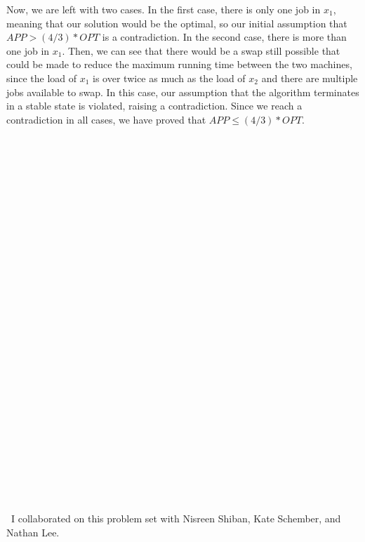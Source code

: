 \documentclass[11pt]{article}
\begin{document}
\begin{enumerate}
Now, we are left with two cases. In the first case, there is only one job in $x_1$, meaning that our solution would be the optimal, so our initial assumption that $APP > (4/3) * OPT$ is a contradiction. In the second case, there is more than one job in $x_1$. Then, we can see that there would be a swap still possible that could be made to reduce the maximum running time between the two machines, since the load of $x_1$ is over twice as much as the load of $x_2$ and there are multiple jobs available to swap. In this case, our assumption that the algorithm terminates in a stable state is violated, raising a contradiction. Since we reach a contradiction in all cases, we have proved that $APP \leq (4/3) * OPT$. 
\\\\\\\\\\\\\\\\\\\\\\\\\\\\\\\\\\\\\\\\\\\\\\\\\\\\\\\\\\\
I collaborated on this problem set with Nisreen Shiban, Kate Schember, and Nathan Lee. 

\end{enumerate}
\end{document}
